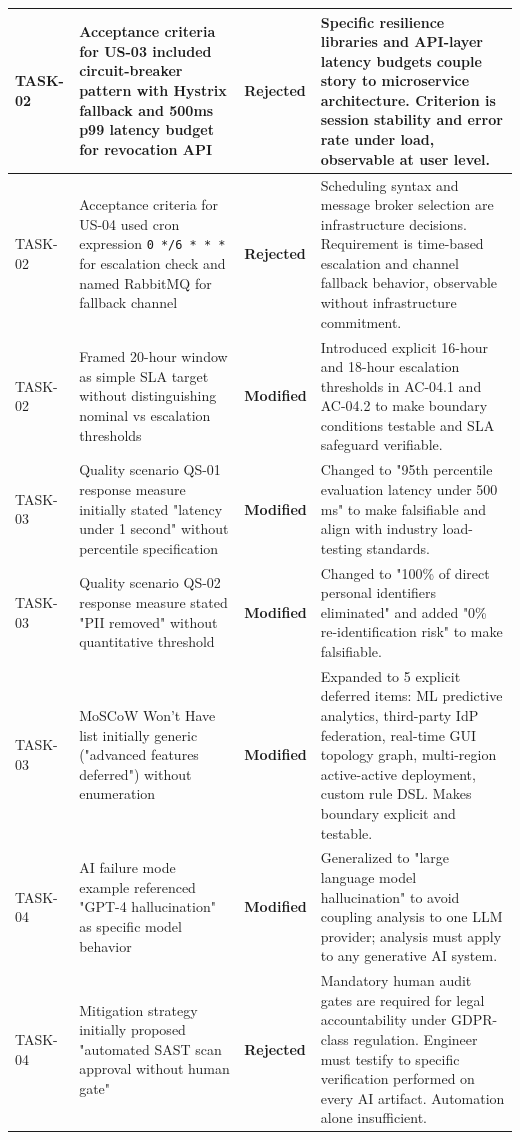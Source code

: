 \documentclass[10pt,a4paper]{article}
\begin{document}
\begin{table}[h]
\begin{tabularx}{\textwidth}{|l|X|l|X|}
\hline
TASK-02 & Acceptance criteria for US-03 included circuit-breaker pattern with Hystrix fallback and 500ms p99 latency budget for revocation API & \textbf{Rejected} & Specific resilience libraries and API-layer latency budgets couple story to microservice architecture. Criterion is session stability and error rate under load, observable at user level. \\
\hline
TASK-02 & Acceptance criteria for US-04 used cron expression \texttt{0 */6 * * *} for escalation check and named RabbitMQ for fallback channel & \textbf{Rejected} & Scheduling syntax and message broker selection are infrastructure decisions. Requirement is time-based escalation and channel fallback behavior, observable without infrastructure commitment. \\
\hline
TASK-02 & Framed 20-hour window as simple SLA target without distinguishing nominal vs escalation thresholds & \textbf{Modified} & Introduced explicit 16-hour and 18-hour escalation thresholds in AC-04.1 and AC-04.2 to make boundary conditions testable and SLA safeguard verifiable. \\
\hline
TASK-03 & Quality scenario QS-01 response measure initially stated "latency under 1 second" without percentile specification & \textbf{Modified} & Changed to "95th percentile evaluation latency under 500 ms" to make falsifiable and align with industry load-testing standards. \\
\hline
TASK-03 & Quality scenario QS-02 response measure stated "PII removed" without quantitative threshold & \textbf{Modified} & Changed to "100\% of direct personal identifiers eliminated" and added "0\% re-identification risk" to make falsifiable. \\
\hline
TASK-03 & MoSCoW Won't Have list initially generic ("advanced features deferred") without enumeration & \textbf{Modified} & Expanded to 5 explicit deferred items: ML predictive analytics, third-party IdP federation, real-time GUI topology graph, multi-region active-active deployment, custom rule DSL. Makes boundary explicit and testable. \\
\hline
TASK-04 & AI failure mode example referenced "GPT-4 hallucination" as specific model behavior & \textbf{Modified} & Generalized to "large language model hallucination" to avoid coupling analysis to one LLM provider; analysis must apply to any generative AI system. \\
\hline
TASK-04 & Mitigation strategy initially proposed "automated SAST scan approval without human gate" & \textbf{Rejected} & Mandatory human audit gates are required for legal accountability under GDPR-class regulation. Engineer must testify to specific verification performed on every AI artifact. Automation alone insufficient. \\

\end{tabularx}
\end{table}
\end{document}
